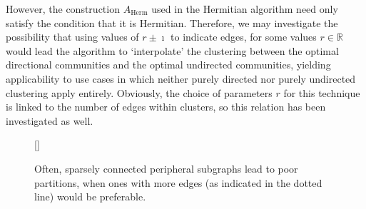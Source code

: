 However, the construction $A_\mathrm{Herm}$ used in the Hermitian algorithm need only satisfy the 
condition that it is Hermitian. Therefore, we may investigate the possibility that using values of 
$r \pm \imath$ to indicate edges, for some values $r\in \mathbb R$ would lead 
the algorithm to 
`interpolate' the clustering between the optimal directional communities and the optimal undirected 
communities, yielding applicability to use cases in which neither purely directed nor purely 
undirected clustering apply entirely. Obviously, the choice of parameters $r$ for this 
technique is linked to the number of edges within clusters, so this relation has been 
investigated as well.

\begin{figure}
[\FBwidth]
{
\caption{Often, sparsely connected peripheral subgraphs lead to poor partitions, when ones with more edges (as indicated in the dotted line) would be preferable.}
\label{fig:pericut}
}{
}
\end{figure}
